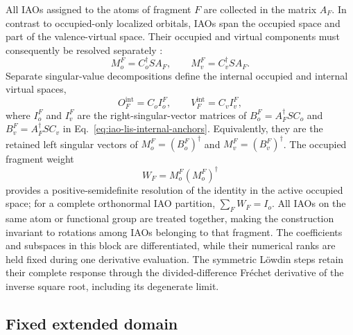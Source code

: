 \documentclass[11pt]{article}
\begin{document}
All IAOs assigned to the atoms of fragment $F$ are collected in the matrix
$A_F$.  In contrast to occupied-only localized orbitals, IAOs span the
occupied space and part of the valence-virtual space.  Their occupied and
virtual components must consequently be resolved separately
\cite{knizia2013,ye2024}:
\begin{equation}
 M_o^F=C_o^\dagger S A_F,
 \qquad
 M_v^F=C_v^\dagger S A_F.
 \label{eq:workflow-iao-projections}
\end{equation}
Separate singular-value decompositions define the internal occupied and
internal virtual spaces,
\begin{equation}
 O_F^{\mathrm{int}}=C_oI_o^F,
 \qquad
 V_F^{\mathrm{int}}=C_vI_v^F,
 \label{eq:workflow-internal-spaces}
\end{equation}
where $I_o^F$ and $I_v^F$ are the right-singular-vector matrices of
$B_o^F=A_F^\dagger SC_o$ and $B_v^F=A_F^\dagger SC_v$ in
Eq.~\eqref{eq:iao-lis-internal-anchors}.  Equivalently, they are the retained
left singular vectors of $M_o^F=(B_o^F)^\dagger$ and
$M_v^F=(B_v^F)^\dagger$.  The occupied fragment weight
\begin{equation}
 W_F=M_o^F(M_o^F)^\dagger
 \label{eq:workflow-fragment-weight}
\end{equation}
provides a positive-semidefinite resolution of the identity in the active
occupied space; for a complete orthonormal IAO partition,
$\sum_F W_F=I_o$.  All IAOs on the same atom or
functional group are treated together, making the construction invariant to
rotations among IAOs belonging to that fragment.  The coefficients and
subspaces in this block are differentiated, while their numerical ranks are
held fixed during one derivative evaluation.  The symmetric L\"owdin steps
retain their complete response through the divided-difference Fr\'echet
derivative of the inverse square root, including its degenerate limit.

\subsection{Fixed extended domain}
\end{document}
